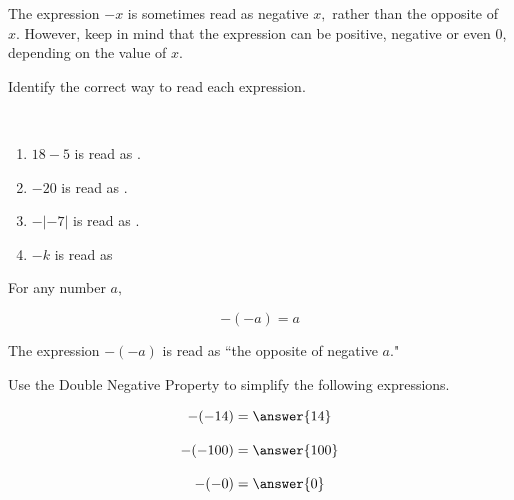 \documentclass{ximera}[font=12pt]
\begin{document}
\begin{remark}
The expression $-x$ is sometimes read as negative $x,$ rather than the opposite of $x.$  However, keep in mind that the expression
can be positive, negative or even 0, depending on the value of $x.$  
\end{remark}


\begin{problem}
Identify the correct way to read each expression.

~ \\[1em]

\begin{enumerate}
\item $18 - 5$ is read as .
\item $-20$ is read as . \\ 
\item $-|-7|$ is read as . \\ 
\item $-k$ is read as  \\ 
\end{enumerate}

\end{problem}


\begin{definition}

For any number $a,$

\[ -(-a) = a \]

The expression $-(-a)$ is read as ``the opposite of negative $a$."

\end{definition}


\begin{problem}
Use the Double Negative Property to simplify the following expressions.

\[ -(-14) = \answer{14} \] 

\[ -(-100) = \answer{100}\] 

\[ -(-0) = \answer{0} \]

\end{problem}
\end{document}
